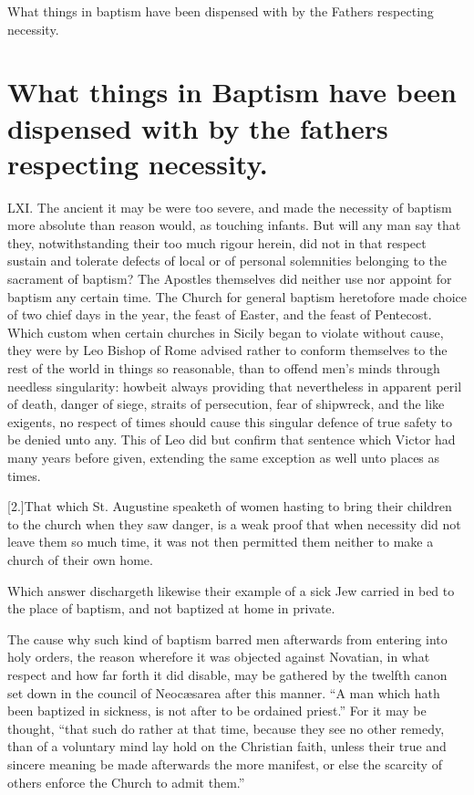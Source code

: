 What things in baptism have been dispensed with by the Fathers respecting necessity.
\section*{What things in Baptism have been dispensed with by the fathers respecting necessity.}
LXI. The ancient it may be were too severe, and made the necessity of baptism more absolute than reason would, as touching  infants. But will any man say that they, notwithstanding their too much rigour herein, did not in that respect sustain and tolerate defects of local or of personal solemnities belonging to the sacrament of baptism? The Apostles themselves did neither use nor appoint for baptism any certain time. The Church for general baptism heretofore made choice of two chief days in the year, the feast of Easter, and the feast of Pentecost. Which custom when certain churches in Sicily began to violate without cause, they were by Leo Bishop of Rome advised rather to conform themselves to the rest of the world in things so reasonable, than to offend men’s minds through needless singularity: howbeit always providing that  nevertheless in apparent peril of death, danger of siege, straits of persecution, fear of shipwreck, and the like exigents, no respect of times should cause this singular defence of true safety to be denied unto any.
 This of Leo did but confirm that sentence which Victor had many years before given, extending the same exception as well unto places as times.

[2.]That which St. Augustine speaketh of women hasting to bring their children to the church when they saw danger, is a weak proof that when necessity did not leave them so much time, it was not then permitted them neither to make a church of their own home.

Which answer dischargeth likewise their example of a sick Jew carried in bed to the place of baptism, and not baptized at home in private.

The cause why such kind of baptism barred men afterwards from entering into holy orders, the reason wherefore it was objected against Novatian, in what respect and how far forth it did disable, may be gathered by the twelfth canon set down in the council of Neocæsarea after this manner. “A man which hath been baptized in sickness, is not after to be ordained priest.” For it may be thought, “that such do rather at that time, because they see no other remedy, than of a voluntary mind lay hold on the Christian faith, unless their true and sincere meaning be made afterwards the more manifest, or else the scarcity of others enforce the Church to admit them.”



